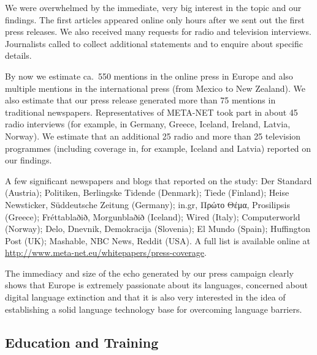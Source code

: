 \documentclass[10pt, plain]{../../metanetpaper}
\begin{document}
\begin{multicols}{2}
We were overwhelmed by the immediate, very big interest in the topic and our findings. The first articles appeared online only hours after we sent out the first press releases. We also received many requests for radio and television interviews. Journalists called to collect additional statements and to enquire about specific details. 

By now we estimate ca.~550 mentions in the online press in Europe and also multiple mentions in the international press (from Mexico to New Zealand). We also estimate that our press release generated more than 75 mentions in traditional newspapers. Representatives of META-NET took part in about 45 radio interviews (for example, in Germany, Greece, Iceland, Ireland, Latvia, Norway). We estimate that an additional 25 radio and more than 25 television programmes (including coverage in, for example, Iceland and Latvia) reported on our findings. 

A few significant newspapers and blogs that reported on the study: Der Standard (Austria); Politiken, Berlingske Tidende (Denmark); Tiede (Finland); Heise Newsticker, Süddeutsche Zeitung (Germany); in.gr, Πρώτο Θέμα, Pro\-silip\-sis (Greece); Fréttablaðið, Morgunblaðið (Iceland); Wired (Italy); Computerworld (Norway); Delo, Dnevnik, De\-mo\-kra\-cija (Slovenia); El Mundo (Spain); Huffington Post (UK); Mashable, NBC News, Reddit (USA). A full list is available online at \url{http://www.meta-net.eu/whitepapers/press-coverage}. 

The immediacy and size of the echo generated by our press campaign clearly shows that Europe is extremely passionate about its languages, concerned about digital language extinction and that it is also very interested in the idea of establishing a solid language technology base for overcoming language barriers. 

\subsection{Education and Training}
\label{sec:improved-edu-and-training}


\end{multicols}
\end{document}
